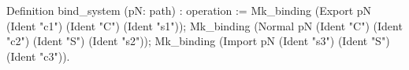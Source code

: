 Definition bind_system (pN: path) : operation :=
 Mk_binding (Export pN (Ident "c1") (Ident "C") (Ident "s1"));
 Mk_binding (Normal pN (Ident "C") (Ident "c2") 
                   (Ident "S") (Ident "s2"));
 Mk_binding (Import pN (Ident "s3") (Ident "S") (Ident "c3")).